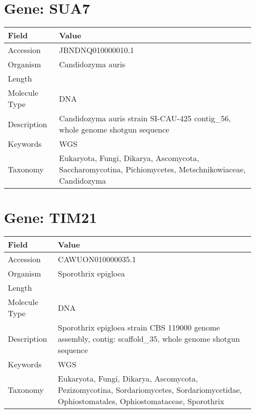 \documentclass[10pt]{article}
\begin{document}
\section{Gene: SUA7}
{\footnotesize
\begin{longtable}{>{\raggedright\arraybackslash}p{4.5cm} >{\raggedright\arraybackslash}p{11.5cm}}
\textbf{Field} & \textbf{Value} \\
\hline
Accession & JBNDNQ010000010.1 \\
Organism & Candidozyma auris \\
Length & 776911 \\
Molecule Type & DNA \\
Description & Candidozyma auris strain SI-CAU-425 contig\_56, whole genome shotgun sequence \\
Keywords & WGS \\
Taxonomy & Eukaryota, Fungi, Dikarya, Ascomycota, Saccharomycotina, Pichiomycetes, Metschnikowiaceae, Candidozyma \\
\end{longtable}
}

\vspace{1em}
\section{Gene: TIM21}
{\footnotesize
\begin{longtable}{>{\raggedright\arraybackslash}p{4.5cm} >{\raggedright\arraybackslash}p{11.5cm}}
\textbf{Field} & \textbf{Value} \\
\hline
Accession & CAWUON010000035.1 \\
Organism & Sporothrix epigloea \\
Length & 172627 \\
Molecule Type & DNA \\
Description & Sporothrix epigloea strain CBS 119000 genome assembly, contig: scaffold\_35, whole genome shotgun sequence \\
Keywords & WGS \\
Taxonomy & Eukaryota, Fungi, Dikarya, Ascomycota, Pezizomycotina, Sordariomycetes, Sordariomycetidae, Ophiostomatales, Ophiostomataceae, Sporothrix \\
\end{longtable}
}

\vspace{1em}
\end{document}
